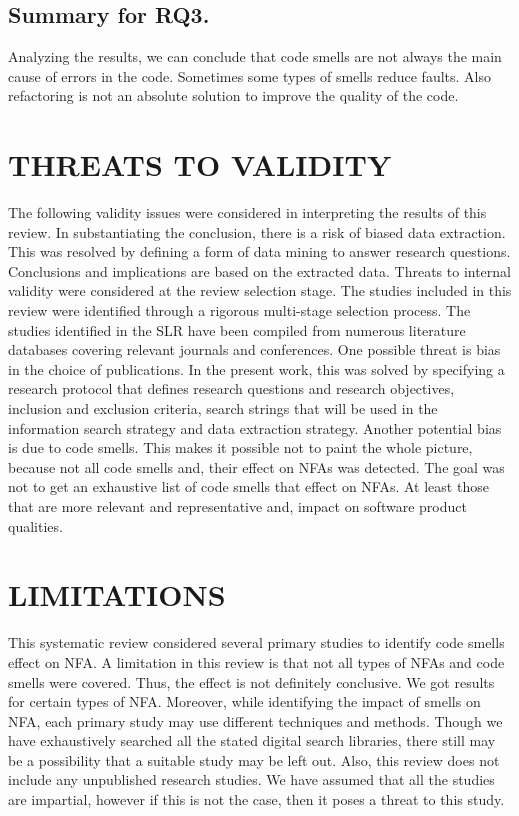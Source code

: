 \documentclass{sigchi}
\begin{document}
\subsection{Summary for RQ3.}
Analyzing the results, we can conclude that code smells are not always the main cause of errors in the code. Sometimes some types of smells reduce faults. Also refactoring is not an absolute solution to improve the quality of the code.


\section{THREATS TO VALIDITY}

The following validity issues were considered in interpreting the results of this review. In substantiating the conclusion, there is a risk of biased data extraction. This was resolved by defining a form of data mining to answer research questions. Conclusions and implications are based on the extracted data. Threats to internal validity were considered at the review selection stage. The studies included in this review were identified through a rigorous multi-stage selection process. The studies identified in the SLR have been compiled from numerous literature databases covering relevant journals and conferences. One possible threat is bias in the choice of publications. In the present work, this was solved by specifying a research protocol that defines research questions and research objectives, inclusion and exclusion criteria, search strings that will be used in the information search strategy and data extraction strategy. Another potential bias is due to code smells. This makes it possible not to paint the whole picture, because not all code smells and, their effect on NFAs was detected. The goal was not to get an exhaustive list of code smells that effect on NFAs. At least those that are more relevant and representative and, impact on software product qualities.

\section{LIMITATIONS}

This systematic review considered several primary studies to identify code smells effect on NFA. A limitation in this review is that not all types of NFAs and code smells were covered. Thus, the effect is not definitely conclusive. We got results for certain types of NFA. Moreover, while identifying the impact of smells on NFA, each primary study may use different techniques and methods. Though we have exhaustively searched all the stated digital search libraries, there still may be a possibility that a suitable study may be left out. Also, this review does not include any unpublished research studies. We have assumed that all the studies are impartial, however if this is not the case, then it poses a threat to this study.
\end{document}
